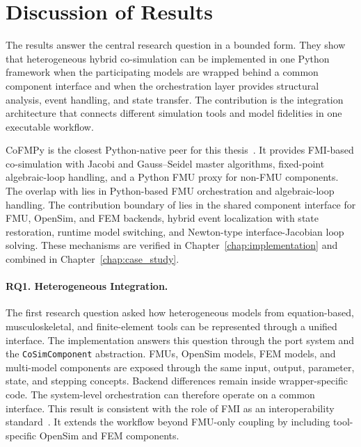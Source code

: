 \section{Discussion of Results}
\label{sec:discussion_results}

The results answer the central research question in a bounded form.
They show that heterogeneous hybrid co-simulation can be implemented in one Python framework when the participating models are wrapped behind a common component interface and when the orchestration layer provides structural analysis, event handling, and state transfer.
The contribution is the integration architecture that connects different simulation tools and model fidelities in one executable workflow.

CoFMPy is the closest Python-native peer for this thesis~\cite{friedrich_cofmpy_2025}.
It provides \ac{FMI}-based co-simulation with Jacobi and Gauss--Seidel master algorithms, fixed-point algebraic-loop handling, and a Python \ac{FMU} proxy for non-\ac{FMU} components.
The overlap with \syssimx{} lies in Python-based \ac{FMU} orchestration and algebraic-loop handling.
The contribution boundary of \syssimx{} lies in the shared component interface for \ac{FMU}, OpenSim, and FEM backends, hybrid event localization with state restoration, runtime model switching, and Newton-type interface-Jacobian loop solving.
These mechanisms are verified in Chapter~\ref{chap:implementation} and combined in Chapter~\ref{chap:case_study}.

\paragraph{RQ1. Heterogeneous Integration.}
The first research question asked how heterogeneous models from equation-based, musculoskeletal, and finite-element tools can be represented through a unified interface.
The implementation answers this question through the port system and the \texttt{CoSimComponent} abstraction.
\acp{FMU}, OpenSim models, \ac{FEM} models, and multi-model components are exposed through the same input, output, parameter, state, and stepping concepts.
Backend differences remain inside wrapper-specific code.
The system-level orchestration can therefore operate on a common interface.
This result is consistent with the role of \ac{FMI} as an interoperability standard~\cite{modelica_association_project_fmi_functional_2014,modelica_association_project_fmi_functional_2024}.
It extends the workflow beyond \ac{FMU}-only coupling by including tool-specific OpenSim and \ac{FEM} components.

